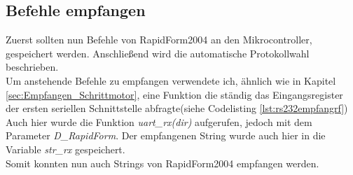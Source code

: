 \subsection{Befehle empfangen}
Zuerst sollten nun Befehle von RapidForm2004 an den Mikrocontroller, gespeichert werden. Anschließend wird die automatische Protokollwahl beschrieben.\\
Um anstehende Befehle zu empfangen verwendete ich, ähnlich wie in Kapitel \ref{sec:Empfangen_Schrittmotor}, eine Funktion die ständig das Eingangsregister der ersten seriellen Schnittstelle abfragte(siehe Codelisting \ref{lst:rs232empfangrf}) Auch hier wurde die Funktion \emph{uart\_rx(dir)} aufgerufen, jedoch mit dem Parameter \emph{D\_RapidForm}. Der empfangenen String wurde auch hier in die Variable \emph{str\_rx} gespeichert.\\
Somit konnten nun auch Strings von RapidForm2004 empfangen werden.
\lstset{language=Java, basicstyle=\footnotesize, showstringspaces=false, tabsize=8}


